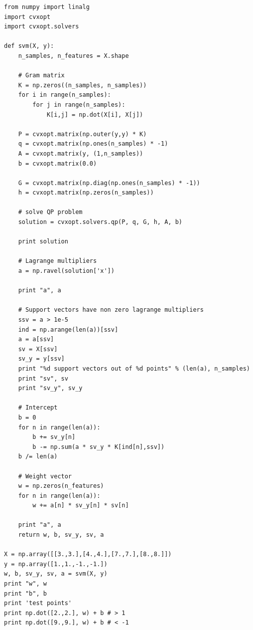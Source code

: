 \documentclass[12pt,fleqn]{article}\usepackage{../../common}
\begin{document}
\begin{verbatim}
from numpy import linalg
import cvxopt
import cvxopt.solvers

def svm(X, y):
    n_samples, n_features = X.shape

    # Gram matrix
    K = np.zeros((n_samples, n_samples))
    for i in range(n_samples):
        for j in range(n_samples):
            K[i,j] = np.dot(X[i], X[j])

    P = cvxopt.matrix(np.outer(y,y) * K)
    q = cvxopt.matrix(np.ones(n_samples) * -1)
    A = cvxopt.matrix(y, (1,n_samples))
    b = cvxopt.matrix(0.0)

    G = cvxopt.matrix(np.diag(np.ones(n_samples) * -1))
    h = cvxopt.matrix(np.zeros(n_samples))

    # solve QP problem
    solution = cvxopt.solvers.qp(P, q, G, h, A, b)

    print solution
    
    # Lagrange multipliers
    a = np.ravel(solution['x'])
    
    print "a", a

    # Support vectors have non zero lagrange multipliers
    ssv = a > 1e-5
    ind = np.arange(len(a))[ssv]
    a = a[ssv]
    sv = X[ssv]
    sv_y = y[ssv]
    print "%d support vectors out of %d points" % (len(a), n_samples)
    print "sv", sv
    print "sv_y", sv_y

    # Intercept
    b = 0
    for n in range(len(a)):
        b += sv_y[n]
        b -= np.sum(a * sv_y * K[ind[n],ssv])
    b /= len(a)
        
    # Weight vector
    w = np.zeros(n_features)
    for n in range(len(a)):
        w += a[n] * sv_y[n] * sv[n]

    print "a", a
    return w, b, sv_y, sv, a

X = np.array([[3.,3.],[4.,4.],[7.,7.],[8.,8.]])
y = np.array([1.,1.,-1.,-1.])
w, b, sv_y, sv, a = svm(X, y)
print "w", w
print "b", b
print 'test points'
print np.dot([2.,2.], w) + b # > 1
print np.dot([9.,9.], w) + b # < -1
\end{verbatim}
\end{document}
